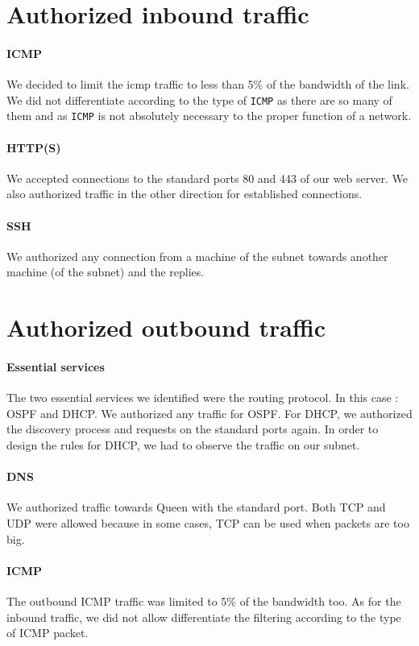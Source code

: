 \documentclass[a4paper,titlepage]{article}
\begin{document}
\section{Authorized inbound traffic}

\paragraph{ICMP} We decided to limit the icmp traffic to less than 5\% of the bandwidth of the link. We did not differentiate according to the type of \texttt{ICMP} as there are so many of them and as \texttt{ICMP} is not absolutely necessary to the proper function of a network.

\paragraph{HTTP(S)} We accepted connections to the standard ports 80 and 443 of our web server. We also authorized traffic in the other direction for established connections.

\paragraph{SSH} We authorized any connection from a machine of the subnet towards another machine (of the subnet) and the replies.

\section{Authorized outbound traffic}
\paragraph{Essential services} The two essential services we identified were the routing protocol. In this case : OSPF and DHCP. We authorized any traffic for OSPF. For DHCP, we authorized the discovery process and requests on the standard ports again. In order to design the rules for DHCP, we had to observe the traffic on our subnet.

\paragraph{DNS} We authorized traffic towards Queen with the standard port. Both TCP and UDP were allowed because in some cases, TCP can be used when packets are too big.

\paragraph{ICMP} The outbound ICMP traffic was limited to 5\% of the bandwidth too. As for the inbound traffic, we did not allow differentiate the filtering according to the type of ICMP packet.
\end{document}
